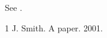 \documentclass{elscopy}
\begin{document}
See \citep{a}.
\begin{thebibliography}{1}
 J. Smith. A paper. 2001.
\end{thebibliography}
\end{document}
